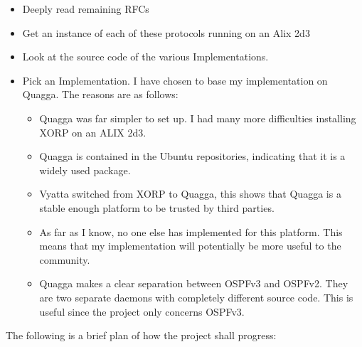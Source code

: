 \documentclass[12pt]{report}
\begin{document}
\begin{itemize}

\item Deeply read remaining RFCs
\item Get an instance of each of these protocols running on an Alix 2d3
\item Look at the source code of the various Implementations. 
\item Pick an Implementation. I have chosen to base my implementation on Quagga.
The reasons are as follows: 

\begin{itemize}
\item Quagga was far simpler to set up. I had many more difficulties installing
XORP on an ALIX 2d3.
\item Quagga is contained in the Ubuntu repositories, indicating that it is a
widely used package. 
\item Vyatta switched from XORP to Quagga, this shows that Quagga is a stable
enough platform to be trusted by third parties. 
\item As far as I know, no one else has implemented for this platform. This means
that my implementation will potentially be more useful to the community. 
\item Quagga makes a clear separation between OSPFv3 and OSPFv2. They are two
separate daemons with completely different source code. This is useful since the
project only concerns OSPFv3.
\end{itemize}


\end{itemize}

\em 

The following is a brief plan of how the project shall progress:
\end{document}
